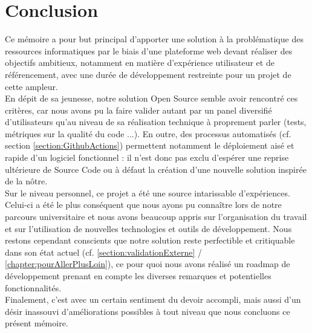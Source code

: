 \chapter{Conclusion}

Ce mémoire a pour but principal d’apporter une solution à la problématique des ressources informatiques par le biais d’une plateforme web devant réaliser des objectifs ambitieux, notamment en matière d’expérience utilisateur et de référencement, avec une durée de développement restreinte pour un projet de cette ampleur. \\

En dépit de sa jeunesse, notre solution Open Source semble avoir rencontré ces critères, car nous avons pu la faire valider autant par un panel diversifié d’utilisateurs qu’au niveau de sa réalisation technique à proprement parler (tests, métriques sur la qualité du code ...). En outre, des processus automatisés (cf. section \ref{section:GithubActions}) permettent notamment le déploiement aisé et rapide d’un logiciel fonctionnel : il n’est donc pas exclu d’espérer une reprise ultérieure de Source Code ou à défaut la création d’une nouvelle solution inspirée de la nôtre. \\

Sur le niveau personnel, ce projet a été une source intarissable d’expériences. Celui-ci a été le plus conséquent que nous ayons pu connaître lors de notre parcours universitaire et nous avons beaucoup appris sur l’organisation du travail et sur l’utilisation de nouvelles technologies et outils de développement. Nous restons cependant conscients que notre solution reste perfectible et critiquable dans son état actuel (cf. \ref{section:validationExterne} / \ref{chapter:pourAllerPlusLoin}), ce pour quoi nous avons réalisé un roadmap de développement prenant en compte les diverses remarques et potentielles fonctionnalités. \\

Finalement, c'est avec un certain sentiment du devoir accompli, mais aussi d'un désir inassouvi d'améliorations possibles à tout niveau que nous concluons ce présent mémoire. 
